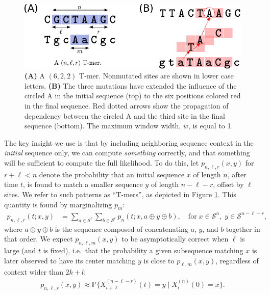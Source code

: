 \documentclass{article}
\renewcommand{\P}{\mathbb{P}}
\newcommand{\calS}{\mathcal{S}}  %
\newcommand{\nA}{\mbox{A}}  %
\newcommand{\join}{\oplus}  %
\theoremstyle{plain}
\theoremstyle{definition}
\begin{document}
\begin{figure}
    \begin{center}
        \includegraphics{Tmer-dependency}
    \end{center}
    \caption{
        \textbf{(A)} A $(6,2,2)$ T-mer.
        Nonmutated sites are shown in lower case letters.
        \textbf{(B)}
        The three mutations have extended the influence of the circled \nA{} 
        in the initial sequence (top)
        to the six positions colored red in the final sequence.
        Red dotted arrows show the propagation of dependency 
        between the circled \nA{}
        and the third site in the final sequence (bottom).
        The maximum window width, $w$, is equal to 1.
        \label{fig:Tmers}
    }
\end{figure}



The key insight we use is that by including neighboring sequence context in the \emph{initial} sequence only,
we can compute \emph{something} correctly,
and that something will be sufficient to compute the full likelihood.
To do this, let $p_{n,\ell,r}(x,y)$ for $r+\ell < n$ denote
the probability that an initial sequence $x$ of length $n$, after time $t$,
is found to match a smaller sequence $y$ of length $n-\ell-r$, offset by $\ell$ sites.
We refer to such patterns as ``T-mers'', as depicted in Figure \ref{fig:Tmers}.
This quantity is found by marginalizing $p_m$:
\begin{align}
    p_{n,\ell,r}(t;x,y) &= \sum_{a \in \calS^\ell} \sum_{b \in \calS^r} p_n(t;x,a \join y \join b) , \quad \text{for}\; x \in \calS^n, \; y \in \calS^{n-\ell-r} ,
\end{align}
where $a \join y \join b$ is the sequence composed of concatenating $a$, $y$, and $b$ together in that order.
We expect $p_{n,\ell,m}(x,y)$ to be asymptotically correct when $\ell$ is large (and $t$ is fixed),
i.e.\ that the probability a given subsequence matching $x$ is later observed to have its center matching $y$
is close to $p_{\ell,m}(x,y)$, regardless of context wider than $2k+l$:
\begin{align} \label{eqn:window_approx}
    p_{n,\ell,r}(x,y) \approx \P\{ X_{i+\ell}^{(n-\ell-r)}(t) = y \mid X_i^{(n)}(0) = x \}.
\end{align}
\end{document}
